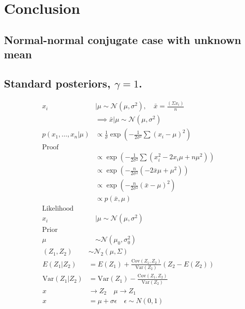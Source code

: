 \documentclass[12pt]{article}
\begin{document}
\section{Conclusion}
\clearpage
\begin{appendices}
\section{Normal-normal conjugate case with unknown mean}
\subsection{Standard posteriors,  $\gamma = 1$.}
\begin{equation*}
\begin{aligned}
    x_i &|\mu\sim \mathcal{N}(\mu,\sigma^2),\quad \bar{x}= \frac{(\Sigma x_i)}{n}\\
    &\implies \bar{x}|\mu \sim \mathcal{N}(\mu,\sigma^2)\\
    p(x_1,\ldots,x_n|\mu)&\propto \frac{1}{\sigma}\exp\left(-\frac{1}{2\sigma^2}\sum(x_i-\mu)^2\right)\\
    \text{Proof}\\
    &\propto \exp\left(-\frac{1}{2\sigma^2}\sum(x_i^2-2x_i\mu +n\mu^2)\right)\\
    &\propto \exp\left(-\frac{n}{2\sigma^2}(-2\bar{x}\mu + \mu^2)\right)\\
     &\propto \exp\left(-\frac{n}{2\sigma^2}(\bar{x} - \mu)^2\right)\\
     &\propto p(\bar{x}, \mu)\\
\text{Likelihood} \\
    x_i &|\mu\sim \mathcal{N}(\mu,\sigma^2)\\
\text{Prior}\\
\mu &\sim \mathcal{N}(\mu_0,\sigma^2_0)
    \end{aligned}
\end{equation*}
\begin{equation*}
\begin{aligned}
(Z_1, Z_2) &\sim \mathcal{N}_2 \left(\mu, \Sigma \right)\\
    E(Z_1 | Z_2) &= E(Z_1) + \frac{\text{Cov}(Z_1, Z_2)}{\text{Var}(Z_2)} \left( Z_2 - E(Z_2) \right) \\
    \text{Var}(Z_1 | Z_2) &= \text{Var}(Z_1) - \frac{\text{Cov}(Z_1, Z_2)}{\text{Var}(Z_2)}\\
   x &\rightarrow Z_2 \quad \mu \rightarrow Z_1\\
   x&= \mu+\sigma\epsilon \quad \epsilon \sim N(0,1)\\

\end{aligned}
\end{equation*}
\end{appendices}
\end{document}

